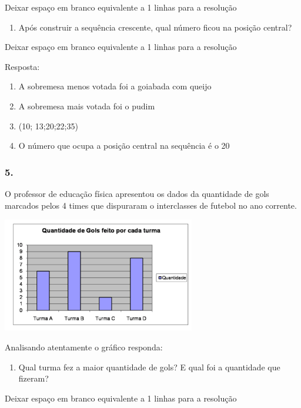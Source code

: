 Deixar espaço em branco equivalente a 1 linhas para a resolução

\begin{enumerate}
\def\labelenumi{\alph{enumi})}
\item
  Após construir a sequência crescente, qual número ficou na posição
  central?
\end{enumerate}

Deixar espaço em branco equivalente a 1 linhas para a resolução

Resposta:

\begin{enumerate}
\def\labelenumi{\alph{enumi})}
\item
  A sobremesa menos votada foi a goiabada com queijo
\item
  A sobremesa mais votada foi o pudim
\item
  (10; 13;20;22;35)
\item
  O número que ocupa a posição central na sequência é o 20
\end{enumerate}

\subsubsection{5.}\label{section-95}

O professor de educação física apresentou os dados da quantidade de gols
marcados pelos 4 times que dispuraram o interclasses de futebol no ano
corrente.

\includegraphics[width=3.30769in,height=1.97201in]{media/image97.png}

Analisando atentamente o gráfico responda:

\begin{enumerate}
\def\labelenumi{\alph{enumi})}
\item
  Qual turma fez a maior quantidade de gols? E qual foi a quantidade que
  fizeram?
\end{enumerate}

Deixar espaço em branco equivalente a 1 linhas para a resolução


